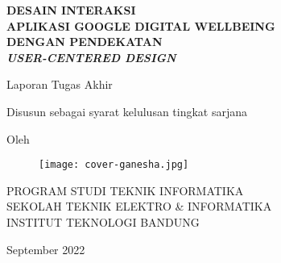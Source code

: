 \clearpage
\pagestyle{empty}

\begin{center}
    \smallskip
    
    \Large \bfseries \MakeUppercase{Desain Interaksi} \\
    \Large \bfseries \MakeUppercase{Aplikasi Google Digital Wellbeing} \\
    \Large \bfseries \MakeUppercase{Dengan Pendekatan} \\
    \Large \bfseries \MakeUppercase{\textit{User-Centered Design}}
    \vfill
    
    \Large Laporan Tugas Akhir
    \vfill
    
    \large Disusun sebagai syarat kelulusan tingkat sarjana
    \vfill
    
    \large Oleh
    
    \Large \theauthor
    
    \vfill
    \begin{figure}[h]
        \centering
        \texttt{[image: cover-ganesha.jpg]}
    \end{figure}
    \vfill
    
    \large
    \uppercase{
        Program Studi Teknik Informatika \\
        Sekolah Teknik Elektro \& Informatika \\
        Institut Teknologi Bandung
    }
    
    September 2022
    
\end{center}

\clearpage
